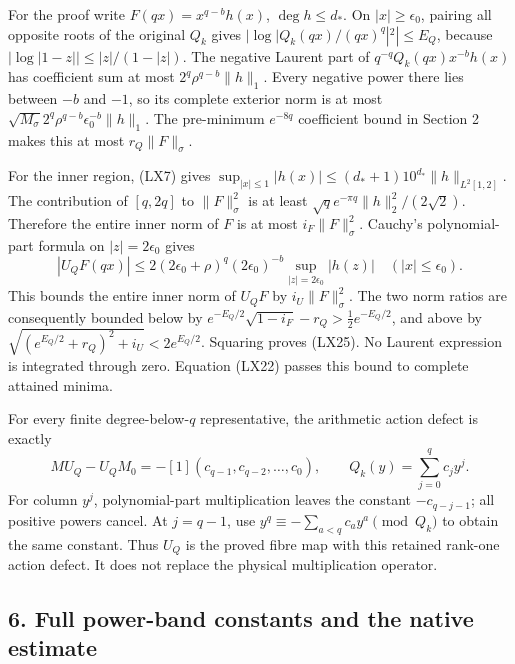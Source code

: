 \documentclass[10pt]{article}
\begin{document}
For the proof write \(F(qx)=x^{q-b}h(x)\), \(\deg h\le d_*\). On \(|x|\ge\epsilon_0\), pairing all opposite roots of the original \(Q_k\) gives \(|\log|Q_k(qx)/(qx)^q|^2|\le E_Q\), because \(|\log|1-z||\le |z|/(1-|z|)\). The negative Laurent part of \(q^{-q}Q_k(qx)x^{-b}h(x)\) has coefficient sum at most \(2^q\rho^{q-b}\|h\|_1\). Every negative power there lies between \(-b\) and \(-1\), so its complete exterior norm is at most \(\sqrt{M_\sigma}2^q\rho^{q-b}\epsilon_0^{-b}\|h\|_1\). The pre-minimum \(e^{-8q}\) coefficient bound in Section 2 makes this at most \(r_Q\|F\|_\sigma\).

For the inner region, (LX7) gives \(\sup_{|x|\le1}|h(x)|\le(d_*+1)10^{d_*}\|h\|_{L^2[1,2]}\). The contribution of \([q,2q]\) to \(\|F\|_\sigma^2\) is at least \(\sqrt q e^{-\pi q}\|h\|_2^2/(2\sqrt2)\). Therefore the entire inner norm of \(F\) is at most \(i_F\|F\|_\sigma^2\). Cauchy's polynomial-part formula on \(|z|=2\epsilon_0\) gives \[
|U_QF(qx)|\le2(2\epsilon_0+\rho)^q(2\epsilon_0)^{-b}
\sup_{|z|=2\epsilon_0}|h(z)|\quad(|x|\le\epsilon_0).
\] This bounds the entire inner norm of \(U_QF\) by \(i_U\|F\|_\sigma^2\). The two norm ratios are consequently bounded below by \(e^{-E_Q/2}\sqrt{1-i_F}-r_Q>\tfrac12e^{-E_Q/2}\), and above by \(\sqrt{(e^{E_Q/2}+r_Q)^2+i_U}<2e^{E_Q/2}\). Squaring proves (LX25). No Laurent expression is integrated through zero. Equation (LX22) passes this bound to complete attained minima.

For every finite degree-below-\(q\) representative, the arithmetic action defect is exactly \[
MU_Q-U_QM_0=-[1](c_{q-1},c_{q-2},\ldots,c_0),
\qquad Q_k(y)=\sum_{j=0}^qc_jy^j.
\tag{LX26}
\] For column \(y^j\), polynomial-part multiplication leaves the constant \(-c_{q-j-1}\); all positive powers cancel. At \(j=q-1\), use \(y^q\equiv-\sum_{a<q}c_ay^a\pmod{Q_k}\) to obtain the same constant. Thus \(U_Q\) is the proved fibre map with this retained rank-one action defect. It does not replace the physical multiplication operator.

\subsection{6. Full power-band constants and the native estimate}\label{full-power-band-constants-and-the-native-estimate}
\end{document}
